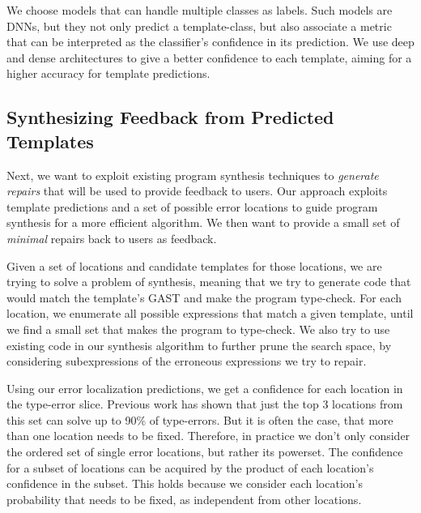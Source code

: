  We choose models that can handle multiple
classes as labels. Such models are DNNs, but they not only predict a
template-class, but also associate a metric that can be interpreted as the
classifier’s confidence in its prediction. We use deep and dense architectures
to give a better confidence to each template, aiming for a higher accuracy for
template predictions.

\subsection{Synthesizing Feedback from Predicted Templates}
\label{sec:overview:synthesis}

Next, we want to exploit existing program synthesis techniques to \emph{generate
repairs} that will be used to provide feedback to users. Our approach exploits
template predictions and a set of possible error locations to guide program
synthesis for a more efficient algorithm. We then want to provide a small set of
\emph{minimal} repairs back to users as feedback.

 Given a set of locations and candidate templates for
those locations, we are trying to solve a problem of synthesis, meaning that we
try to generate code that would match the template’s GAST and make the program
type-check. For each location, we enumerate all possible expressions that match
a given template, until we find a small set that makes the program to
type-check. We also try to use existing code in our synthesis algorithm to
further prune the search space, by considering subexpressions of the erroneous
expressions we try to repair.

 Using our error localization
predictions, we get a confidence for each location in the type-error slice.
Previous work has shown that just the top 3 locations from this set can solve up
to 90\% of type-errors. But it is often the case, that more than one location
needs to be fixed. Therefore, in practice we don't only consider the ordered set
of single error locations, but rather its powerset. The confidence for a subset
of locations can be acquired by the product of each location’s confidence in the
subset. This holds because we consider each location’s probability that needs to
be fixed, as independent from other locations.


